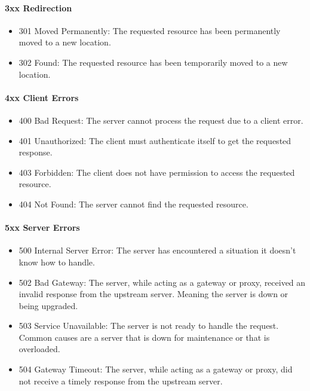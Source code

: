 \documentclass[a4paper]{article}
\begin{document}
            \paragraph{3xx Redirection} 

            \begin{itemize}
                \item 301 Moved Permanently: The requested resource has been permanently moved to a new location.
                \item 302 Found: The requested resource has been temporarily moved to a new location.
            \end{itemize}

            \paragraph{4xx Client Errors}

            \begin{itemize}
                \item 400 Bad Request: The server cannot process the request due to a client error.
                \item 401 Unauthorized: The client must authenticate itself to get the requested response.
                \item 403 Forbidden: The client does not have permission to access the requested resource.
                \item 404 Not Found: The server cannot find the requested resource.
            \end{itemize}

            \paragraph{5xx Server Errors}

            \begin{itemize}
                \item 500 Internal Server Error: The server has encountered a situation it doesn't know how to handle.
                \item 502 Bad Gateway: The server, while acting as a gateway or proxy, received an invalid response from the upstream server. Meaning the server is down or being upgraded.
                \item 503 Service Unavailable: The server is not ready to handle the request. Common causes are a server that is down for maintenance or that is overloaded.
                \item 504 Gateway Timeout: The server, while acting as a gateway or proxy, did not receive a timely response from the upstream server.
            \end{itemize}
\end{document}
